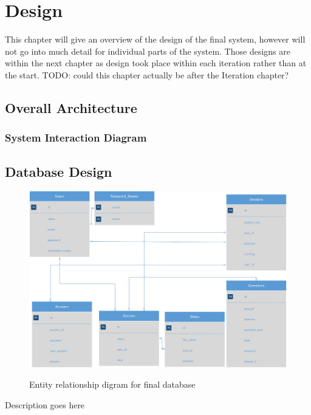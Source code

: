 \chapter{Design}
This chapter will give an overview of the design of the final system, however will not go into much detail for individual parts of the system. Those designs are within the next chapter as design took place within each iteration rather than at the start.
TODO: could this chapter actually be after the Iteration chapter?
\section{Overall Architecture}
\subsection{System Interaction Diagram}

\section{Database Design}
\begin{figure}
	\caption{Entity relationship digram for final database}
	\includegraphics[width=\textwidth]{Chapter2/Final-ER-Image}
	\label{fig:er-diagram}
\end{figure}

Description goes here